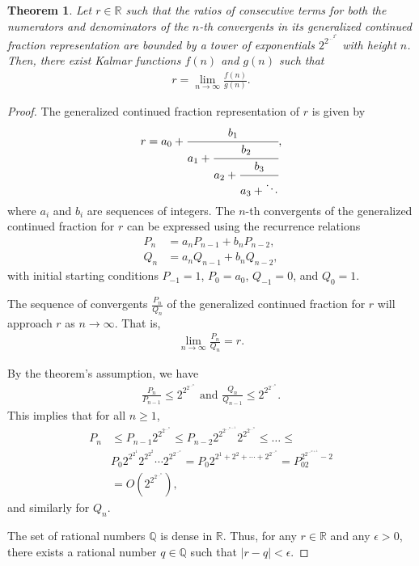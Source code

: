 \documentclass[10pt,a4paper]{article}
\theoremstyle{plain}
\newtheorem{theorem}{Theorem}[section]
\begin{document}
\begin{theorem}
Let $r \in \mathbb{R}$ such that the ratios of consecutive terms for both the numerators and denominators of the $n$-th convergents in its generalized continued fraction representation are bounded by a tower of exponentials $2^{2^{\ldots^{2^n}}}$ with height $n$. Then, there exist Kalmar functions $f(n)$ and $g(n)$ such that
\begin{align*}
r = \lim_{n\to\infty} \frac{f(n)}{g(n)} .
\end{align*}
\end{theorem}
\begin{proof}
The generalized continued fraction representation of $r$ is given by
\begin{align*}
r = a_0 + \cfrac{b_1}{a_1 + \cfrac{b_2}{a_2 + \cfrac{b_3}{a_3 + \ddots}}} ,
\end{align*}
where $a_i$ and $b_i$ are sequences of integers. The $n$-th convergents of the generalized continued fraction for $r$ can be expressed using the recurrence relations
\begin{align*}
P_n &= a_n P_{n-1} + b_n P_{n-2}, \\
Q_n &= a_n Q_{n-1} + b_n Q_{n-2},
\end{align*}
with initial starting conditions $P_{-1} = 1$, $P_0 = a_0$, $Q_{-1} = 0$, and $Q_0 = 1$.

The sequence of convergents $\frac{P_n}{Q_n}$ of the generalized continued fraction for $r$ will approach $r$ as $n\to\infty$. That is,
\begin{align*}
\lim_{n\to\infty} \frac{P_n}{Q_n} = r .
\end{align*}

By the theorem's assumption, we have
\begin{align*}
\frac{P_n}{P_{n-1}} \leq 2^{2^{2^{\ldots^n}}} \text{ and } \frac{Q_n}{Q_{n-1}} \leq 2^{2^{2^{\ldots^n}}} .
\end{align*}
This implies that for all $n \geq 1$,
\begin{align*}
P_n &\leq P_{n-1} 2^{2^{2^{\dots^n}}}
    \leq P_{n-2} 2^{2^{2^{\dots^{n-1}}}} 2^{2^{2^{\dots^n}}}
    \leq \ldots \leq \\
    & P_0 2^{2^{2^1}} 2^{2^{2^2}} \cdots 2^{2^{2^{\dots^n}}}
    = P_0 2^{2^1 + 2^2 + \cdots + 2^{2^{\dots^n}}}
    = P_02^{2^{2^{\dots^{n+1}}} - 2} \\
    &= O(2^{2^{2^{\dots^n}}}),
\end{align*}
and similarly for $Q_n$.

The set of rational numbers $\mathbb{Q}$ is dense in $\mathbb{R}$. Thus, for any $r \in \mathbb{R}$ and any $\epsilon > 0$, there exists a rational number $q \in \mathbb{Q}$ such that $|r - q| < \epsilon$.


\end{proof}
\end{document}
